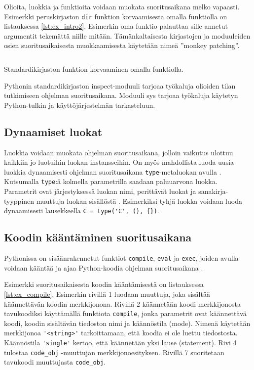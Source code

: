 \documentclass[finnish]{tktltiki2}
\theoremstyle{definition}
\theoremstyle{remark}
\begin{document}
Olioita, luokkia ja funktioita voidaan muokata suoritusaikana melko vapaasti. Esimerkki peruskirjaston \verb|dir| funktion korvaamisesta omalla funktiolla on listauksessa \ref{lst:ex_intro2}. Esimerkin oma funktio palauttaa sille annetut argumentit tekemättä niille mitään. Tämänkaltaisesta kirjastojen ja moduuleiden osien suoritusaikaisesta muokkaamisesta käytetään nimeä ''monkey patching''.

\begin{listing}
    \inputminted[linenos]{python}{code/introspektio2.py}
    \caption{Standardikirjaston funktion korvaaminen omalla funktiolla.}
    \label{lst:ex_intro2}
\end{listing}

Pythonin standardikirjaston inspect-moduuli tarjoaa työkaluja olioiden tilan tutkimiseen ohjelman suoritusaikana. Moduuli sys tarjoaa työkaluja käytetyn Python-tulkin ja käyttöjärjestelmän tarkasteluun.

\subsection{Dynaamiset luokat}

Luokkia voidaan muokata ohjelman suoritusaikana, jolloin vaikutus ulottuu kaikkiin jo luotuihin luokan instansseihin. On myös mahdollista luoda uusia luokkia dynaamisesti ohjelman suoritusaikana \verb|type|-metaluokan avulla \cite{MetaprogP3}. Kutsumalla \verb|type|:ä kolmella parametrilla saadaan paluuarvona luokka. Parametrit ovat järjestyksessä luokan nimi, perittävät luokat ja sanakirja-tyyppinen muuttuja luokan sisällöstä \cite{MetaprogP3}. Esimerkiksi tyhjä luokka voidaan luoda dynaamisesti lausekkeella \verb|C = type('C', (), {})|.



\subsection{Koodin kääntäminen suoritusaikana}

Pythonissa on sisäänrakennetut funktiot \verb|compile|, \verb|eval| ja \verb|exec|, joiden avulla voidaan kääntää ja ajaa Python-koodia ohjelman suoritusaikana \cite{codeobjects,martelli2006python}.

Esimerkki suoritusaikaisesta koodin kääntämisestä on listauksessa \ref{lst:ex_compile}. Esimerkin rivillä 1 luodaan muuttuja, joka sisältää käännettävän koodin merkkijonona. Rivillä 2 käännetään koodi merkkijonosta tavukoodiksi käyttämällä funktiota \verb|compile|, jonka parametrit ovat käännettävä koodi, koodin sisältävän tiedoston nimi ja käännöstila (mode). Nimenä käytetään merkkijonoa \verb|'<string>'| tarkoittamaan, että koodia ei ole luettu tiedostosta. Käännöstila \verb|'single'| kertoo, että käännetään yksi lause (statement). Rivi 4 tulostaa \verb|code_obj| -muuttujan merkkijonoesityksen. Rivillä 7 suoritetaan tavukoodi muuttujasta \verb|code_obj|.
\end{document}
